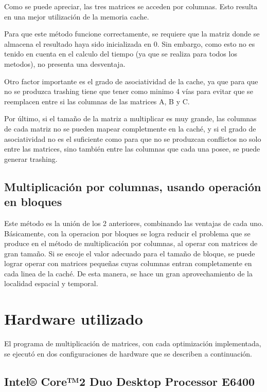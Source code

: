 \documentclass[a4paper,10pt]{article}
\begin{document}
Como se puede apreciar, las tres matrices se acceden por columnas. Esto resulta en una mejor utilización de la memoria cache.

Para que este método funcione correctamente, se requiere que la matriz donde se almacena el resultado haya sido inicializada en 0. Sin embargo, como esto no es tenido en cuenta en el calculo del tiempo (ya que se realiza para todos los metodos), no presenta una desventaja.

Otro factor importante es el grado de asociatividad de la cache, ya que para que no se produzca trashing tiene que tener como minimo 4 vías para evitar que se reemplacen entre si las columnas de las matrices A, B y C.

Por último, si el tamaño de la matriz a multiplicar es muy grande, las columnas de cada matriz no se pueden mapear completmente en la caché, y si el grado de asociatividad no es el suficiente como para que no se produzcan conflictos no solo entre las matrices, sino también entre las columnas que cada una posee, se puede generar trashing.

\subsection{Multiplicación por columnas, usando operación en bloques}

Este método es la unión de los 2 anteriores, combinando las ventajas de cada uno. Básicamente, con la operacion por bloques se logra reducir el problema que se produce en el método de multiplicación por columnas, al operar con matrices de gran tamaño. Si se escoje el valor adecuado para el tamaño de bloque, se puede lograr operar con matrices pequeñas cuyas columnas entran completamente en cada linea de la caché. De esta manera, se hace un gran aprovechamiento de la localidad espacial y temporal.

\clearpage
\section{Hardware utilizado}

El programa de multiplicación de matrices, con cada optimización implementada, se ejecutó en dos configuraciones de hardware que se describen a continuación.

\subsection{Intel® Core™2 Duo Desktop Processor E6400}
\end{document}
